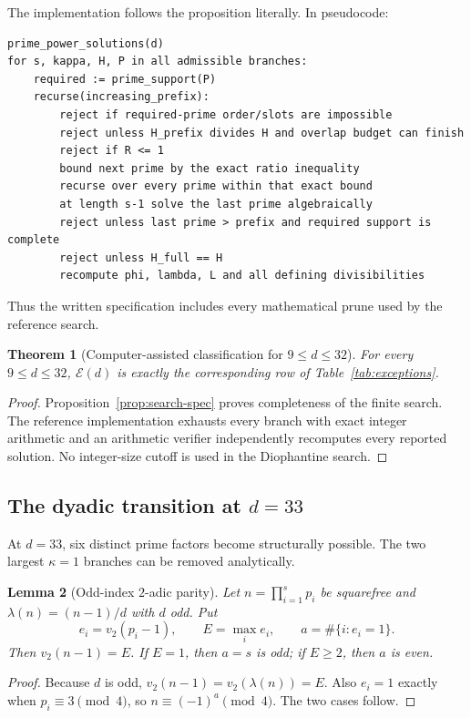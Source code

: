 \documentclass[11pt]{article}
\newtheorem{theorem}{Theorem}[section]
\newtheorem{lemma}[theorem]{Lemma}
\newcommand{\Eset}{\mathcal E}
\begin{document}
The implementation follows the proposition literally.  In pseudocode:
\begin{verbatim}
prime_power_solutions(d)
for s, kappa, H, P in all admissible branches:
    required := prime_support(P)
    recurse(increasing_prefix):
        reject if required-prime order/slots are impossible
        reject unless H_prefix divides H and overlap budget can finish
        reject if R <= 1
        bound next prime by the exact ratio inequality
        recurse over every prime within that exact bound
        at length s-1 solve the last prime algebraically
        reject unless last prime > prefix and required support is complete
        reject unless H_full == H
        recompute phi, lambda, L and all defining divisibilities
\end{verbatim}
Thus the written specification includes every mathematical prune used by the
reference search.

\begin{theorem}[Computer-assisted classification for $9\le d\le32$]
\label{thm:d32}
For every $9\le d\le32$, $\Eset(d)$ is exactly the corresponding row of
Table~\ref{tab:exceptions}.
\end{theorem}

\begin{proof}
Proposition~\ref{prop:search-spec} proves completeness of the finite search.
The reference implementation exhausts every branch with exact integer
arithmetic and an arithmetic verifier independently recomputes every reported
solution.  No integer-size cutoff is used in the Diophantine search.
\end{proof}

\subsection{The dyadic transition at $d=33$}
\label{subsec:d33}

At $d=33$, six distinct prime factors become structurally possible.  The two
largest $\kappa=1$ branches can be removed analytically.

\begin{lemma}[Odd-index $2$-adic parity]
\label{lem:odd-index-parity}
Let $n=\prod_{i=1}^s p_i$ be squarefree and
$\lambda(n)=(n-1)/d$ with $d$ odd.  Put
\[
e_i=v_2(p_i-1),\qquad E=\max_i e_i,
\qquad a=\#\{i:e_i=1\}.
\]
Then $v_2(n-1)=E$.  If $E=1$, then $a=s$ is odd; if $E\ge2$, then $a$ is
even.
\end{lemma}

\begin{proof}
Because $d$ is odd,
$v_2(n-1)=v_2(\lambda(n))=E$.  Also $e_i=1$ exactly when
$p_i\equiv3\pmod4$, so $n\equiv(-1)^a\pmod4$.  The two cases follow.
\end{proof}
\end{document}
